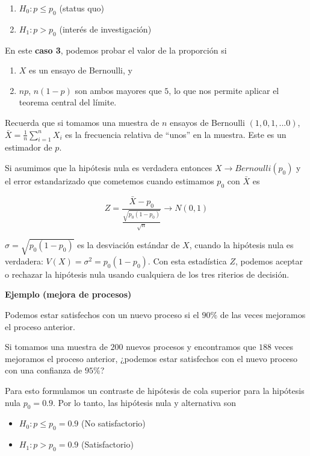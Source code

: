 \documentclass[
]{book}
\providecommand{\tightlist}{%
  \setlength{\itemsep}{0pt}\setlength{\parskip}{0pt}}
\begin{document}
\begin{enumerate}
\def\labelenumi{\alph{enumi}.}
\tightlist
\item
  \(H_0: p \leq p_0\) (status quo)
\item
  \(H_1: p> p_0\) (interés de investigación)
\end{enumerate}

En este \textbf{caso 3}, podemos probar el valor de la proporción si

\begin{enumerate}
\def\labelenumi{\arabic{enumi}.}
\tightlist
\item
  \(X\) es un ensayo de Bernoulli, y
\item
  \(np\), \(n(1-p)\) son ambos mayores que \(5\), lo que nos permite aplicar el teorema central del límite.
\end{enumerate}

Recuerda que si tomamos una muestra de \(n\) ensayos de Bernoulli \((1,0,1,...0)\), \(\bar{X}=\frac{1}{n}\sum_{i=1 }^n X_i\) es la frecuencia relativa de ``unos'' en la muestra. Este es un estimador de \(p\).

Si asumimos que la hipótesis nula es verdadera entonces \(X \rightarrow Bernoulli(p_0)\) y el error estandarizado que cometemos cuando estimamos \(p_0\) con \(\bar{X}\) es

\[Z=\frac{\bar{X}-p_0}{\frac{\sqrt{p_0(1-p_0)}}{\sqrt{n}}} \rightarrow N(0,1)\]

\(\sigma=\sqrt{p_0(1-p_0)}\) es la desviación estándar de \(X\), cuando la hipótesis nula es verdadera: \(V(X)=\sigma^2=p_0(1-p_0)\). Con esta estadística \(Z\), podemos aceptar o rechazar la hipótesis nula usando cualquiera de los tres riterios de decisión.

\textbf{Ejemplo (mejora de procesos)}

Podemos estar satisfechos con un nuevo proceso si el \(90\%\) de las veces mejoramos el proceso anterior.

Si tomamos una muestra de \(200\) nuevos procesos y encontramos que \(188\) veces mejoramos el proceso anterior, ¿podemos estar satisfechos con el nuevo proceso con una confianza de \(95\%\)?

Para esto formulamos un contraste de hipótesis de cola superior para la hipótesis nula \(p_0=0.9\). Por lo tanto, las hipótesis nula y alternativa son

\begin{itemize}
\tightlist
\item
  \(H_0: p \leq p_0=0.9\) (No satisfactorio)
\item
  \(H_1: p> p_0=0.9\) (Satisfactorio)
\end{itemize}
\end{document}
